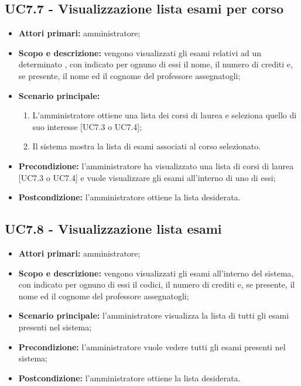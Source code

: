 \documentclass[AnalisiDeiRequisiti.tex]{subfiles}
\begin{document}
\subsection{UC7.7 - Visualizzazione lista esami per corso}
\begin{itemize}
	\item \textbf{Attori primari:} amministratore;
	\item \textbf{Scopo e descrizione:} vengono visualizzati gli esami relativi ad un determinato , con indicato per ognuno di essi il nome, il numero di crediti e, se presente, il nome ed il cognome del professore assegnatogli;
	\item \textbf{Scenario principale:}
	\begin{enumerate}
		\item L'amministratore ottiene una lista dei corsi di laurea e seleziona quello di suo interesse [UC7.3 o UC7.4];
		\item Il sistema mostra la lista di esami associati al corso selezionato.
	\end{enumerate}
	\item \textbf{Precondizione:} l'amministratore ha visualizzato una lista di corsi di laurea [UC7.3 o UC7.4] e vuole visualizzare gli esami all'interno di uno di essi; 
	\item \textbf{Postcondizione:} l'amministratore ottiene la lista desiderata.
\end{itemize}
\subsection{UC7.8 - Visualizzazione lista esami}
\begin{itemize}
	\item \textbf{Attori primari:} amministratore;
	\item \textbf{Scopo e descrizione:} vengono visualizzati gli esami all'interno del sistema, con indicato per ognuno di essi il codici, il numero di crediti e, se presente, il nome ed il cognome del professore assegnatogli;
	\item \textbf{Scenario principale:} l'amministratore visualizza la lista di tutti gli esami presenti nel sistema;
	\item \textbf{Precondizione:} l'amministratore vuole vedere tutti gli esami presenti nel sistema; 
	\item \textbf{Postcondizione:} l'amministratore ottiene la lista desiderata.
\end{itemize}
\end{document}
